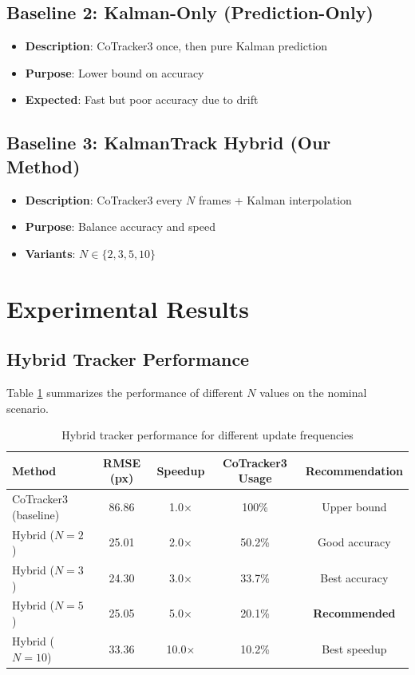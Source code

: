\documentclass[11pt]{article}
\begin{document}
\subsection{Baseline 2: Kalman-Only (Prediction-Only)}
\begin{itemize}
    \item \textbf{Description}: CoTracker3 once, then pure Kalman prediction
    \item \textbf{Purpose}: Lower bound on accuracy
    \item \textbf{Expected}: Fast but poor accuracy due to drift
\end{itemize}

\subsection{Baseline 3: KalmanTrack Hybrid (Our Method)}
\begin{itemize}
    \item \textbf{Description}: CoTracker3 every $N$ frames + Kalman interpolation
    \item \textbf{Purpose}: Balance accuracy and speed
    \item \textbf{Variants}: $N \in \{2, 3, 5, 10\}$
\end{itemize}

\section{Experimental Results}

\subsection{Hybrid Tracker Performance}

Table \ref{tab:results} summarizes the performance of different $N$ values on the nominal scenario.

\begin{table}[h]
\centering
\caption{Hybrid tracker performance for different update frequencies}
\label{tab:results}
\begin{tabular}{@{}lcccc@{}}
\toprule
\textbf{Method} & \textbf{RMSE (px)} & \textbf{Speedup} & \textbf{CoTracker3 Usage} & \textbf{Recommendation} \\
\midrule
CoTracker3 (baseline) & 86.86 & 1.0× & 100\% & Upper bound \\
\midrule
Hybrid ($N=2$) & 25.01 & 2.0× & 50.2\% & Good accuracy \\
Hybrid ($N=3$) & 24.30 & 3.0× & 33.7\% & Best accuracy \\
Hybrid ($N=5$) & 25.05 & 5.0× & 20.1\% & \textbf{Recommended} \\
Hybrid ($N=10$) & 33.36 & 10.0× & 10.2\% & Best speedup \\
\bottomrule
\end{tabular}
\end{table}
\end{document}

